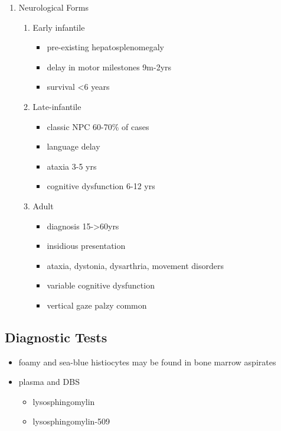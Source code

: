 \documentclass{scrartcl}
\begin{document}
\begin{enumerate}
\item Neurological Forms
\label{sec:org4fc3ceb}
\begin{enumerate}
\item Early infantile
\label{sec:org8df46e8}
\begin{itemize}
\item pre-existing hepatosplenomegaly
\item delay in motor milestones 9m-2yrs
\item survival <6 years
\end{itemize}

\item Late-infantile
\label{sec:orge50194b}
\begin{itemize}
\item classic NPC 60-70\% of cases
\item language delay
\item ataxia 3-5 yrs
\item cognitive dysfunction 6-12 yrs
\end{itemize}

\item Adult
\label{sec:org9fe8658}
\begin{itemize}
\item diagnosis 15->60yrs
\item insidious presentation
\item ataxia, dystonia, dysarthria, movement disorders
\item variable cognitive dysfunction
\item vertical gaze palzy common
\end{itemize}
\end{enumerate}
\end{enumerate}

\subsection{Diagnostic Tests}
\label{sec:orgb1dee7b}
\begin{itemize}
\item foamy and sea-blue histiocytes may be found in bone marrow aspirates
\item plasma and DBS
\begin{itemize}
\item lysosphingomylin
\item lysosphingomylin-509
\end{itemize}
\end{itemize}
\end{document}
